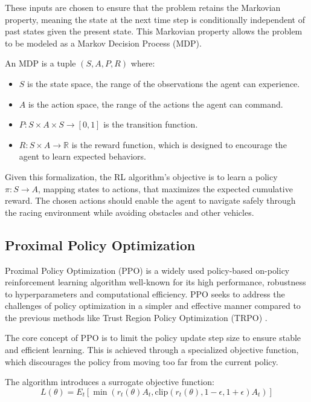 \documentclass[a4paper, 10pt]{LTJournalArticle}
\begin{document}
These inputs are chosen to ensure that the problem retains the Markovian property, meaning the state at the next time step is conditionally independent of past states given the present state. This Markovian property allows the problem to be modeled as a Markov Decision Process (MDP)\autocite{Sutton:2023qr}.

An MDP is a tuple $(S, A, P, R)$ where:

\begin{itemize}
\item $S$ is the state space, the range of the observations the agent can experience.
\item $A$ is the action space, the range of the actions the agent can command.
\item $P: S \times A \times S \rightarrow [0, 1]$ is the transition function.
\item $R: S \times A \rightarrow \mathbb{R}$ is the reward function, which is designed to encourage the agent to learn expected behaviors.
\end{itemize}

Given this formalization, the RL algorithm's objective is to learn a policy $\pi: S \rightarrow A$, mapping states to actions, that maximizes the expected cumulative reward. The chosen actions should enable the agent to navigate safely through the racing environment while avoiding obstacles and other vehicles.


\subsection{Proximal Policy Optimization}
Proximal Policy Optimization (PPO) \autocite{Schulman:2017}{} is a widely used policy-based  on-policy reinforcement learning algorithm well-known for its high performance, robustness to hyperparameters and computational efficiency. PPO seeks to address the challenges of policy optimization in a simpler and effective manner compared to the previous methods like Trust Region Policy Optimization (TRPO) \autocite{Schulmann:2015}. 

The core concept of PPO is to limit the policy update step size to ensure stable and efficient learning. This is achieved through a specialized objective function, which discourages the policy from moving too far from the current policy. 

The algorithm introduces a surrogate objective function:
\begin{equation*}
    L(\theta) = E_t[\min(r_t(\theta)A_t, \text{clip}(r_t(\theta), 1-\epsilon, 1+\epsilon)A_t)]
\end{equation*}
\end{document}
